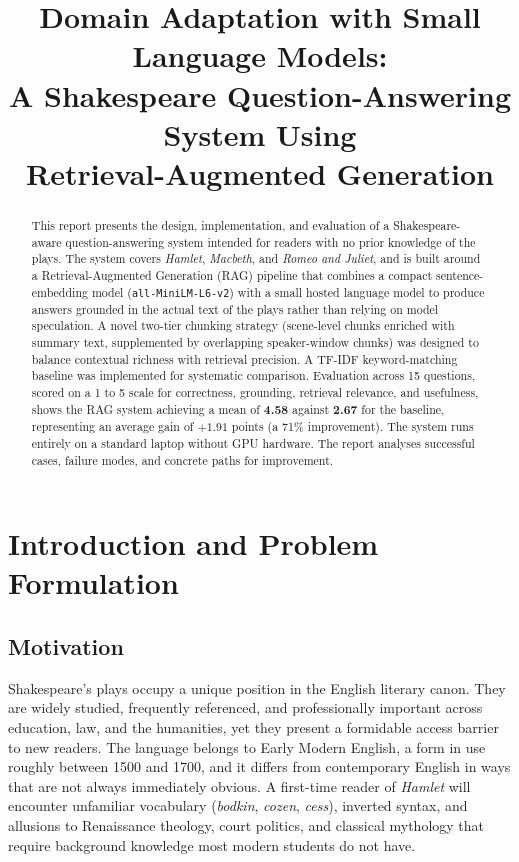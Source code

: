 \documentclass[10pt,conference]{IEEEtran}
\title{Domain Adaptation with Small Language Models:\\[2pt]
A Shakespeare Question-Answering System Using\\
Retrieval-Augmented Generation}
\author{
  \IEEEauthorblockN{%
    Sri Siddhartha A.\ (1038023),\;
    Hemanth V.\ (1277091),\;
    Tejeshwar R.\ M.\ (1017536),\;
    Vinay Sabarad (1106363)%
  }
  \IEEEauthorblockA{Group 7\enspace --\enspace
  CSCI433/933, University of Wollongong}
}
\begin{document}
\maketitle

\begin{abstract}
This report presents the design, implementation, and evaluation of a
Shakespeare-aware question-answering system intended for readers with
no prior knowledge of the plays. The system covers \textit{Hamlet},
\textit{Macbeth}, and \textit{Romeo and Juliet}, and is built around
a Retrieval-Augmented Generation (RAG) pipeline that combines a
compact sentence-embedding model (\texttt{all-MiniLM-L6-v2}) with a
small hosted language model to produce answers grounded in the actual
text of the plays rather than relying on model speculation. A novel
two-tier chunking strategy (scene-level chunks enriched with summary
text, supplemented by overlapping speaker-window chunks) was designed
to balance contextual richness with retrieval precision. A TF-IDF
keyword-matching baseline was implemented for systematic comparison.
Evaluation across 15 questions, scored on a 1 to 5 scale for
correctness, grounding, retrieval relevance, and usefulness, shows the
RAG system achieving a mean of \textbf{4.58} against \textbf{2.67}
for the baseline, representing an average gain of $\mathbf{+1.91}$
points (a 71\% improvement). The system runs entirely on a standard
laptop without GPU hardware. The report analyses successful cases,
failure modes, and concrete paths for improvement.
\end{abstract}

\section{Introduction and Problem Formulation}
\label{sec:introduction}

\subsection{Motivation}

Shakespeare's plays occupy a unique position in the English literary
canon. They are widely studied, frequently referenced, and
professionally important across education, law, and the humanities,
yet they present a formidable access barrier to new readers. The
language belongs to Early Modern English, a form in use roughly
between 1500 and 1700, and it differs from contemporary English in
ways that are not always immediately obvious. A first-time reader of
\textit{Hamlet} will encounter unfamiliar vocabulary (\textit{bodkin},
\textit{cozen}, \textit{cess}), inverted syntax, and allusions to
Renaissance theology, court politics, and classical mythology that
require background knowledge most modern students do not have.
\end{document}
